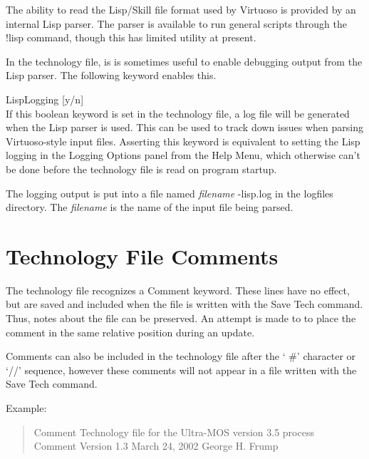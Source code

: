 The ability to read the Lisp/Skill file format used by Virtuoso is
provided by an internal Lisp parser.  The parser is available to run
general scripts through the {\cb !lisp} command, though this has
limited utility at present.

In the technology file, is is sometimes useful to enable debugging
output from the Lisp parser.  The following keyword enables this.

\begin{description}
\item{\vt LispLogging} [{\vt y/n}]\\
If this boolean keyword is set in the technology file, a log file will
be generated when the Lisp parser is used.  This can be used to track
down issues when parsing Virtuoso-style input files.  Asserting this
keyword is equivalent to setting the Lisp logging in the {\cb Logging
Options} panel from the {\cb Help Menu}, which otherwise can't be done
before the technology file is read on program startup.

The logging output is put into a file named {\it filename\/}{\vt
-lisp.log} in the logfiles directory.  The {\it filename} is the name
of the input file being parsed.
\end{description}


\section{Technology File Comments}

The technology file recognizes a {\vt Comment} keyword.  These lines have
no effect, but are saved and included when the file is written with
the {\cb Save Tech} command.  Thus, notes about the file can be preserved. 
An attempt is made to to place the comment in the same relative
position during an update.

Comments can also be included in the technology file after the `{\vt
\#}' character or `{\vt //}' sequence, however these comments will not
appear in a file written with the {\cb Save Tech} command.

Example:
\begin{quote} \vt
Comment  Technology file for the Ultra-MOS version 3.5 process\\
Comment  Version 1.3  March 24, 2002  George H. Frump
\end{quote}


